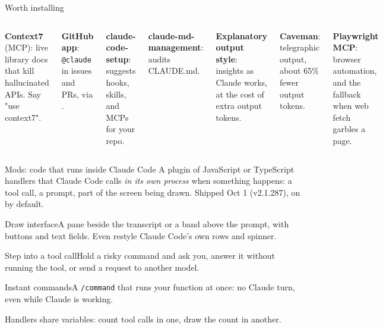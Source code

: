 \documentclass[aspectratio=169,11pt,t]{beamer}
\begin{document}
\begin{frame}{Worth installing}
  \begin{columns}[T,onlytextwidth]
      \par\vspace{0.35em}\small
      \textbf{Context7} (MCP): live library docs that kill hallucinated APIs. Say "use context7".\par\vspace{0.35em}
      \textbf{GitHub app}: \texttt{@claude} in issues and PRs, via .\par\vspace{0.35em}
      \textbf{claude-code-setup}: suggests hooks, skills, and MCPs for your repo.\par\vspace{0.35em}
      \textbf{claude-md-management}: audits CLAUDE.md.
      \par\vspace{0.35em}\small
      \textbf{Explanatory output style}: insights as Claude works, at the cost of extra output tokens.\par\vspace{0.35em}
      \textbf{Caveman}: telegraphic output, about 65\% fewer output tokens.\par\vspace{0.35em}
      \textbf{Playwright MCP}: browser automation, and the fallback when web fetch garbles a page.
  \end{columns}
\end{frame}

\begin{frame}{Mods: code that runs inside Claude Code}
  \small A plugin of JavaScript or TypeScript handlers that Claude Code calls \emph{in its own process} when something happens: a tool call, a prompt, part of the screen being drawn. Shipped Oct 1 (v2.1.287), on by default.\par\vspace{0.5em}
  \begin{tcbraster}[raster columns=3, raster equal height, raster column skip=6pt]
    \begin{card}{Draw interface}A pane beside the transcript or a band above the prompt, with buttons and text fields. Even restyle Claude Code's own rows and spinner.\end{card}
    \begin{card}{Step into a tool call}Hold a risky command and ask you, answer it without running the tool, or send a request to another model.\end{card}
    \begin{card}{Instant commands}A \texttt{/command} that runs your function at once: no Claude turn, even while Claude is working.\end{card}
  \end{tcbraster}\par\vspace{0.3em}
  {\footnotesize\color{muted}Handlers share variables: count tool calls in one, draw the count in another.}
\end{frame}
\end{document}
